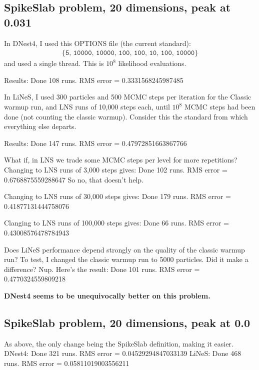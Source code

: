 \documentclass[a4paper, 12pt]{article}
\begin{document}
\subsection{SpikeSlab problem, 20 dimensions, peak at 0.031}
In DNest4, I used this OPTIONS file (the current standard):
\begin{align}
\{\texttt{5, 10000, 10000, 100, 100, 10, 100, 10000}\}
\end{align}
and used
a single thread. This is $10^8$ likelihood evaluations.

Results:
Done 108 runs. RMS error = 0.3331568245987485

In LiNeS, I used 300 particles and 500 MCMC steps per iteration
for the Classic warmup run, and
LNS runs of 10,000 steps each, until $10^8$ MCMC steps
had been done (not counting the classic warmup).
Consider this the standard from which everything else
departs.

Results:
Done 147 runs. RMS error = 0.47972851663867766

What if, in LNS we trade some MCMC steps per level
for more repetitions? Changing to LNS runs of
3,000 steps gives:
Done 102 runs. RMS error = 0.6768875559288647
So no, that doesn't help.

Changing to LNS runs of 30,000 steps gives:
Done 179 runs. RMS error = 0.41877131444758076

Clanging to LNS runs of 100,000 steps gives:
Done 66 runs. RMS error = 0.43008576478784943

Does LiNeS performance depend strongly on the quality of the
classic warmup run? To test, I changed the classic warmup run to 5000
particles. Did it make a difference? Nup. Here's the result:
Done 101 runs. RMS error = 0.4770324559809218

{\bf DNest4 seems to be unequivocally better on this problem.}

\subsection{SpikeSlab problem, 20 dimensions, peak at 0.0}
As above, the only change being the SpikeSlab definition, making it
easier.
DNest4: Done 321 runs. RMS error = 0.04529294847033139
LiNeS: Done 468 runs. RMS error = 0.05811019003556211




\end{document}
